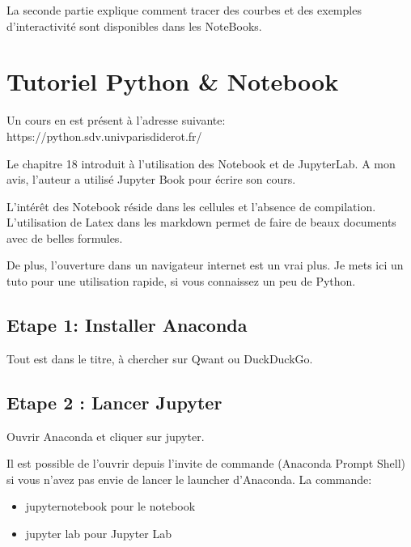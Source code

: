 \documentclass[letterpaper,10pt,english]{sphinxmanual}
\begin{document}
La seconde partie explique comment tracer des courbes et des exemples d’interactivité sont disponibles dans les NoteBooks.


\chapter{Tutoriel Python \& Notebook}
\label{\detokenize{Part1/NoteBookTuto:tutoriel-python-notebook}}\label{\detokenize{Part1/NoteBookTuto::doc}}
Un cours en  est présent à l’adresse suivante: https://python.sdv.univ\sphinxhyphen{}paris\sphinxhyphen{}diderot.fr/

Le chapitre 18 introduit à l’utilisation des Notebook et de JupyterLab. A mon avis, l’auteur a utilisé Jupyter Book pour écrire son cours.

L’intérêt des Notebook réside dans les cellules et l’absence de compilation. L’utilisation de Latex dans les markdown permet de faire de beaux documents avec de belles formules.

De plus, l’ouverture dans un navigateur internet est un vrai plus. Je mets ici un tuto pour une utilisation rapide, si vous connaissez un peu de Python.


\section{Etape 1: Installer Anaconda}
\label{\detokenize{Part1/NoteBookTuto:etape-1-installer-anaconda}}
Tout est dans le titre, à chercher sur Qwant ou DuckDuckGo.


\section{Etape 2 : Lancer Jupyter}
\label{\detokenize{Part1/NoteBookTuto:etape-2-lancer-jupyter}}
Ouvrir Anaconda et cliquer sur jupyter.

Il est possible de l’ouvrir depuis l’invite de commande (Anaconda Prompt Shell) si vous n’avez pas envie de lancer le launcher d’Anaconda.
La commande:
\begin{itemize}
\item {} 
jupyter\sphinxhyphen{}notebook pour le notebook

\item {} 
jupyter lab pour Jupyter Lab

\end{itemize}
\end{document}
